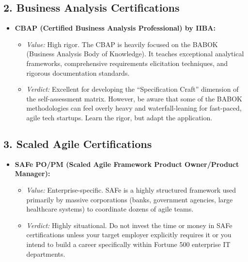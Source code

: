 \documentclass[
  11pt,
  openany,
  oneside]{book}
\providecommand{\tightlist}{%
  \setlength{\itemsep}{0pt}\setlength{\parskip}{0pt}}
\begin{document}
\subsection{2. Business Analysis
Certifications}\label{business-analysis-certifications}

\begin{itemize}
\tightlist
\item
  \textbf{CBAP (Certified Business Analysis Professional) by IIBA:}

  \begin{itemize}
  \tightlist
  \item
    \emph{Value:} High rigor. The CBAP is heavily focused on the BABOK
    (Business Analysis Body of Knowledge). It teaches exceptional
    analytical frameworks, comprehensive requirements elicitation
    techniques, and rigorous documentation standards.
  \item
    \emph{Verdict:} Excellent for developing the ``Specification Craft''
    dimension of the self-assessment matrix. However, be aware that some
    of the BABOK methodologies can feel overly heavy and
    waterfall-leaning for fast-paced, agile tech startups. Learn the
    rigor, but adapt the application.
  \end{itemize}
\end{itemize}

\subsection{3. Scaled Agile
Certifications}\label{scaled-agile-certifications}

\begin{itemize}
\tightlist
\item
  \textbf{SAFe PO/PM (Scaled Agile Framework Product Owner/Product
  Manager):}

  \begin{itemize}
  \tightlist
  \item
    \emph{Value:} Enterprise-specific. SAFe is a highly structured
    framework used primarily by massive corporations (banks, government
    agencies, large healthcare systems) to coordinate dozens of agile
    teams.
  \item
    \emph{Verdict:} Highly situational. Do not invest the time or money
    in SAFe certifications unless your target employer explicitly
    requires it or you intend to build a career specifically within
    Fortune 500 enterprise IT departments.
  \end{itemize}
\end{itemize}
\end{document}
